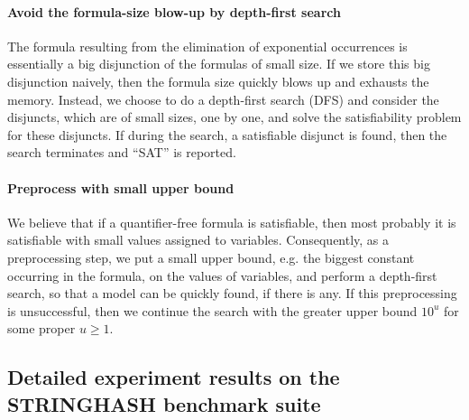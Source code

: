 \paragraph{Avoid the formula-size blow-up by depth-first search}

The {\pa} formula resulting from the elimination of exponential occurrences is essentially a big disjunction of the formulas of small size. If we store this big disjunction naively, then the formula size quickly blows up and exhausts the memory. Instead, we choose to do a depth-first search (DFS) and consider the disjuncts, which are of small sizes, one by one, and solve the satisfiability problem for these disjuncts. If during the search, a satisfiable disjunct is found, then the search terminates and ``SAT'' is reported.

\paragraph{Preprocess with small upper bound}

We believe that if a quantifier-free {\paexp} formula is satisfiable, then most probably it is satisfiable with small values assigned to variables. Consequently, as a preprocessing step, we put a small upper bound, e.g. the biggest constant occurring in the formula, on the values of variables, and perform a depth-first search, so that a model can be quickly found, if there is any. If this preprocessing is unsuccessful, then we continue the search with the greater upper bound $10^u$ for some proper $u \ge 1$.


\subsection{Detailed experiment results on the STRINGHASH benchmark suite}\label{app-exp}

